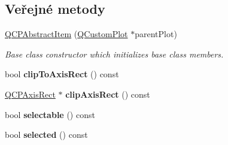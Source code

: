 \subsection*{Veřejné metody}
\begin{DoxyCompactItemize}
\item 
\hypertarget{classQCPAbstractItem_a9922507d8b4503a1fe1ed0b1030e23b6}{}\hyperlink{classQCPAbstractItem_a9922507d8b4503a1fe1ed0b1030e23b6}{Q\+C\+P\+Abstract\+Item} (\hyperlink{classQCustomPlot}{Q\+Custom\+Plot} $\ast$parent\+Plot)\label{classQCPAbstractItem_a9922507d8b4503a1fe1ed0b1030e23b6}

\begin{DoxyCompactList}\small\item\em Base class constructor which initializes base class members. \end{DoxyCompactList}\item 
\hypertarget{classQCPAbstractItem_a5b0ea171823033bcb8aee81f4a034871}{}bool {\bfseries clip\+To\+Axis\+Rect} () const \label{classQCPAbstractItem_a5b0ea171823033bcb8aee81f4a034871}

\item 
\hypertarget{classQCPAbstractItem_a37f86618740b5047eae23eedb2de061a}{}\hyperlink{classQCPAxisRect}{Q\+C\+P\+Axis\+Rect} $\ast$ {\bfseries clip\+Axis\+Rect} () const \label{classQCPAbstractItem_a37f86618740b5047eae23eedb2de061a}

\item 
\hypertarget{classQCPAbstractItem_a9189e752025533e1595eaade0009a3bc}{}bool {\bfseries selectable} () const \label{classQCPAbstractItem_a9189e752025533e1595eaade0009a3bc}

\item 
\hypertarget{classQCPAbstractItem_a225865808640d8d9a7dd19f09a2e93f2}{}bool {\bfseries selected} () const \label{classQCPAbstractItem_a225865808640d8d9a7dd19f09a2e93f2}


\end{DoxyCompactItemize}
